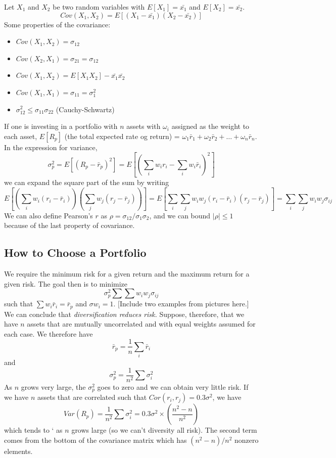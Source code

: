 \documentclass[11pt]{article}
\theoremstyle{definition}
\begin{document}
 Let $X_1$ and $X_2$ be two random variables with $E[X_1] = \bar{x_1}$ and $E[X_2] = \bar{x_2}$. $$Cov(X_1, X_2) = E[(X_1 - \bar{x_1})(X_2 - \bar{x_2})]$$Some properties of the covariance: 
\begin{itemize}
\item $Cov(X_1, X_2) = \sigma_{12}$
\item $Cov(X_2, X_1) = \sigma_{21} = \sigma_{12}$
\item $Cov(X_1, X_2) = E[X_1X_2] - \bar{x_1} \bar{x_2}$
\item $Cov(X_1, X_1) = \sigma_{11} = \sigma_1^2$
\item $\sigma_{12}^2 \leq \sigma_{11} \sigma_{22}$ (Cauchy-Schwartz)
\end{itemize}
If one is investing in a portfolio with $n$ assets with $\omega_i$ assigned as the weight to each asset, $E[R_p]$ (the total expected rate og return) = $\omega_1 \bar{r}_1 +\omega_2 \bar{r}_2 + \dots + \omega_n \bar{r}_n$. In the expression for variance, $$\sigma_p^2 = E[(R_p - \bar{r}_p)^2] = E \left[ \left( \sum_i w_i r_i - \sum_i w_i \bar{r}_i \right)^2 \right]$$we can expand the square part of the sum by writing $$E \left[ \left( \sum_i w_i (r_i - \bar{r}_i) \right) \left( \sum_j w_j (r_j - \bar{r}_j) \right) \right] = E \left[ \sum_i \sum_j w_i w_j (r_i - \bar{r}_i)(r_j - \bar{r}_j) \right] = \boxed{\sum_i \sum_j w_i w_j \sigma_{ij}}$$
We can also define Pearson's $r$ as $\rho = \sigma_{12} / \sigma_1 \sigma_2$, and we can bound $|\rho| \leq 1$ because of the last property of covariance. 

\subsection{How to Choose a Portfolio}

We require the minimum risk for a given return and the maximum return for a given risk. The goal then is to minimize $$\sigma_p^2 \sum \sum w_i w_j \sigma_{ij}$$such that $\sum w_i \bar{r}_i = \bar{r}_p$ and $\sigma w_i = 1$. [Include two examples from pictures here.] We can conclude that \textit{diversification reduces risk.} Suppose, therefore, that we have $n$ assets that are mutually uncorrelated and with equal weights assumed for each case. We therefore have $$\bar{r}_p = \frac{1}{n} \sum_i \bar{r}_i$$ and $$\sigma_p^2 = \frac{1}{n^2} \sum \sigma_i^2$$As $n$ grows very large, the $\sigma_p^2$ goes to zero and we can obtain very little risk. If we have $n$ assets that are correlated such that $Cor(r_i, r_j) = 0.3 \sigma^2$, we have $$Var(R_p) = \frac{1}{n^2} \sum \sigma_i^2 = 0.3 \sigma^2 \times \left( \frac{n^2 - n}{n^2} \right)$$which tends to ` as $n$ grows large (so we can't diversity all risk). The second term comes from the bottom of the covariance matrix which has $(n^2 - n)/n^2$ nonzero elements. 
\end{document}
